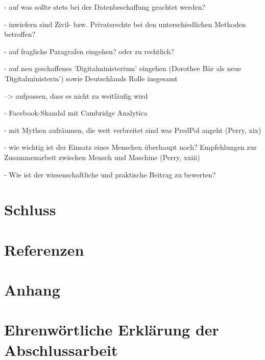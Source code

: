 \documentclass[a4paper,12pt,parskip,bibtotoc,liststotoc]{article}
\begin{document}
- auf was sollte stets bei der Datenbeschaffung geachtet werden?

- inwiefern sind Zivil- bzw. Privatsrechte bei den unterschiedlichen Methoden betroffen? 

- auf fragliche Paragrafen eingehen? oder zu rechtlich? 

- auf neu geschaffenes 'Digitalministerium' eingehen (Dorothee Bär als neue 'Digitalministerin') sowie Deutschlands Rolle insgesamt 

--> aufpassen, dass es nicht zu weitläufig wird

- Facebook-Skandal mit Cambridge Analytica

- mit Mythen aufräumen, die weit verbreitet sind was PredPol angeht (Perry, xix)

- wie wichtig ist der Einsatz eines Menschen überhaupt noch? Empfehlungen zur Zusammenarbeit zwischen Mensch und Maschine (Perry, xxiii) 

- Wie ist der wissenschaftliche und praktische Beitrag zu bewerten?


\newpage
\section{Schluss}

\section{Referenzen}

\section{Anhang}

\section{Ehrenwörtliche Erklärung der Abschlussarbeit}
\end{document}
